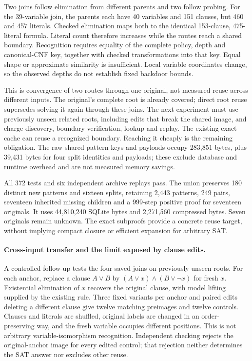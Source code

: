 \documentclass[11pt,a4paper]{article}
\numberwithin{equation}{section}
\theoremstyle{plain}
\theoremstyle{definition}
\theoremstyle{remark}
\begin{document}
Two joins follow elimination from different parents and two follow probing.
For the 39-variable join, the parents each have 40 variables and 151 clauses,
but 460 and 457 literals. Checked elimination maps both to the identical
153-clause, 475-literal formula. Literal count therefore increases while the
routes reach a shared boundary. Recognition requires equality of the complete
policy, depth and canonical-CNF key, together with checked transformations into
that key. Equal shape or approximate similarity is insufficient. Local variable
coordinates change, so the observed depths do not establish fixed backdoor bounds.

This is convergence of two routes through one original, not measured reuse
across different inputs. The original's complete root is already covered;
direct root reuse supersedes solving it again through these joins. The next
experiment must use previously unseen related roots, including edits that break
the shared image, and charge discovery, boundary verification, lookup and replay.
The existing exact cache can reuse a recognized boundary. Reaching it cheaply
is the remaining obligation. The raw shared pattern keys and payloads occupy
283,851 bytes, plus 39,431 bytes for four split identities and payloads; these
exclude database and runtime overhead and are not measured memory savings.

All 372 tests and six independent archive replays pass. The union preserves
180 distinct new patterns and sixteen splits, retaining 2,443 patterns,
249 pairs, seventeen inherited missing children and a 999-step positive proof
for seventeen originals. It uses 44,810,240 SQLite bytes and 2,271,560 compressed
bytes. Seven originals remain unknown. The exact subproofs provide a concrete
reuse target, without implying compact closure or efficient expansion for
arbitrary SAT.

\paragraph{Cross-input transfer and the limit exposed by clause edits.}
A controlled follow-up tests the four saved joins on previously unseen roots.
For each anchor, replace a clause $A\lor B$ by
$(A\lor x)\land(B\lor\neg x)$ for fresh $x$. Existential elimination of $x$
recovers the original clause, with model lifting supplied by the existing rule.
Three fixed variants per anchor and paired edits deleting a different clause
give twelve matching preimages and twelve controls. Clauses and literals are
shuffled, original labels are changed in an order-preserving way, and the fresh
variable occupies different positions. This is not arbitrary variable-isomorphism
recognition. Independent checking rejects the original-anchor image for every
edited control; that rejection neither determines the SAT answer nor excludes
other reuse.
\end{document}
